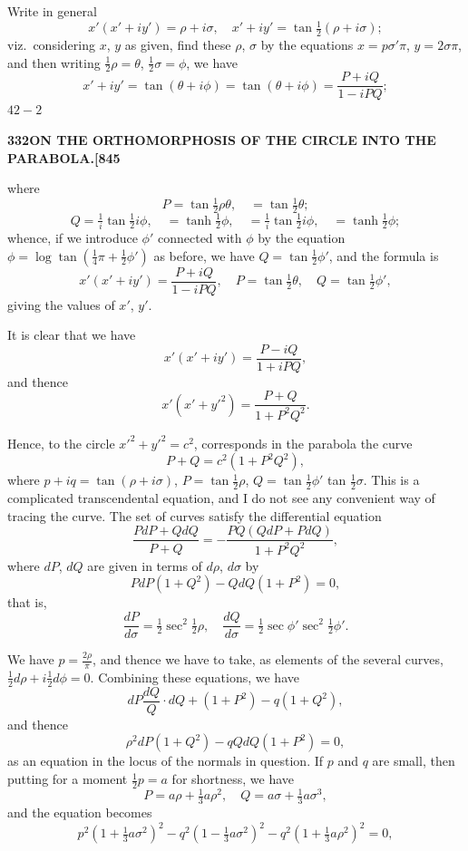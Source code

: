 \documentclass[11pt,a4paper]{book}
\begin{document}
Write in general
\[
x'(x' + iy') = \rho + i\sigma, \quad x' + iy' = \tan\tfrac{1}{2}(\rho + i\sigma);
\]
viz.\ considering $x$, $y$ as given, find these $\rho$, $\sigma$ by the equations $x = p\sigma'\pi$, $y = 2\sigma\pi$, and then writing $\tfrac{1}{2}\rho = \theta$, $\tfrac{1}{2}\sigma = \phi$, we have
\[
x' + iy' = \tan(\theta + i\phi) = \tan(\theta + i\phi) = \frac{P + iQ}{1 - iPQ};
\]
\hfill $42 - 2$

\newpage
\setcounter{page}{332}

\noindent\textbf{332}\hfill\textbf{ON THE ORTHOMORPHOSIS OF THE CIRCLE INTO THE PARABOLA.}\hfill\textbf{[845}

\bigskip

\noindent where
\[
P = \tan\tfrac{1}{2}\rho\theta, \quad = \tan\tfrac{1}{2}\theta;
\]
\[
Q = \tfrac{1}{i}\tan\tfrac{1}{2}i\phi, \quad = \tanh\tfrac{1}{2}\phi, \quad = \tfrac{1}{i}\tan\tfrac{1}{2}i\phi, \quad = \tanh\tfrac{1}{2}\phi;
\]
whence, if we introduce $\phi'$ connected with $\phi$ by the equation $\phi = \log\tan(\tfrac{1}{4}\pi + \tfrac{1}{2}\phi')$ as before, we have $Q = \tan\tfrac{1}{2}\phi'$, and the formula is
\[
x'(x' + iy') = \frac{P + iQ}{1 - iPQ}, \quad P = \tan\tfrac{1}{2}\theta, \quad Q = \tan\tfrac{1}{2}\phi',
\]
giving the values of $x'$, $y'$.

It is clear that we have
\[
x'(x' + iy') = \frac{P - iQ}{1 + iPQ},
\]
and thence
\[
x'(x' + y'^2) = \frac{P + Q}{1 + P^2Q^2}.
\]

Hence, to the circle $x'^2 + y'^2 = c^2$, corresponds in the parabola the curve
\[
P + Q = c^2(1 + P^2Q^2),
\]
where $p + iq = \tan(\rho + i\sigma)$, $P = \tan\tfrac{1}{2}\rho$, $Q = \tan\tfrac{1}{2}\phi'$ tan $\tfrac{1}{2}\sigma$. This is a complicated transcendental equation, and I do not see any convenient way of tracing the curve. The set of curves satisfy the differential equation
\[
\frac{P dP + Q dQ}{P + Q} = -\frac{P Q (Q dP + P dQ)}{1 + P^2 Q^2},
\]
where $dP$, $dQ$ are given in terms of $d\rho$, $d\sigma$ by
\[
P dP(1 + Q^2) - Q dQ(1 + P^2) = 0,
\]
that is,
\[
\frac{dP}{d\sigma} = \tfrac{1}{2}\sec^2\tfrac{1}{2}\rho, \quad \frac{dQ}{d\sigma} = \tfrac{1}{2}\sec\phi'\sec^2\tfrac{1}{2}\phi'.
\]

We have $p = \tfrac{2\rho}{\pi}$, and thence we have to take, as elements of the several curves, $\tfrac{1}{2}d\rho + i \tfrac{1}{2}d\phi = 0$. Combining these equations, we have
\[
dP \frac{dQ}{Q} \cdot dQ + (1 + P^2) - q(1 + Q^2),
\]
and thence
\[
\rho^2 dP(1 + Q^2) - qQ dQ(1 + P^2) = 0,
\]
as an equation in the locus of the normals in question. If $p$ and $q$ are small, then putting for a moment $\tfrac{1}{2}p = a$ for shortness, we have
\[
P = a\rho + \tfrac{1}{3}a\rho^2, \quad Q = a\sigma + \tfrac{1}{3}a\sigma^3,
\]
and the equation becomes
\[
p^2(1 + \tfrac{1}{3}a\sigma^2)^2 - q^2(1 - \tfrac{1}{3}a\sigma^2)^2 - q^2(1 + \tfrac{1}{3}a\rho^2)^2 = 0,
\]
\end{document}
